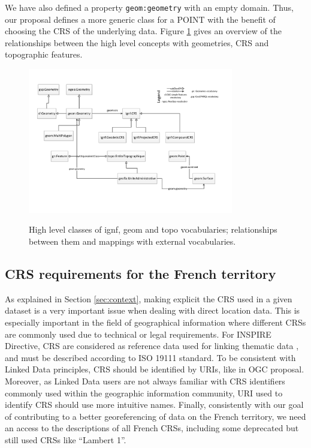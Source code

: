 We have also defined a property \texttt{geom:geometry} with an empty domain. Thus, our proposal defines a more generic class for a \textsf{POINT} with the benefit of choosing the CRS of the underlying data. Figure \ref{fig:geomcrs} gives an overview of the relationships between the high level concepts with geometries, CRS and topographic features.

\begin{figure}[!htbp]
\vspace{-13pt}
  \begin{center}
  \includegraphics[width=0.8\textwidth]{img/vocabs-ign.pdf}
  \vspace{-15pt}
  \caption{High level classes of ignf, geom and topo vocabularies; relationships between them and mappings with external vocabularies.}
  \vspace{-10pt}
  \label{fig:geomcrs}
  \end{center}
\end{figure}



\subsection{CRS requirements for the  French territory} \label{sec:reqs}

As explained in Section \ref{sec:context}, making explicit the CRS used in a given dataset is a very important issue when dealing with direct location data. This is especially important in the field of geographical information where different CRSs are commonly used due to technical or legal requirements. For INSPIRE Directive, CRS are considered as reference data used for linking thematic data \cite{inspire2009}, and must be described according to ISO 19111 standard. To be consistent with Linked Data principles, CRS should be identified by URIs, like in OGC proposal. Moreover, as Linked Data users are not always familiar with CRS identifiers commonly used within the geographic information community, URI used to identify CRS should use more intuitive names. Finally, consistently with our goal of contributing to a better georeferencing of data on the French territory, we need an access to the descriptions of all French CRSs, including some deprecated but still used CRSs like ``Lambert 1''.


